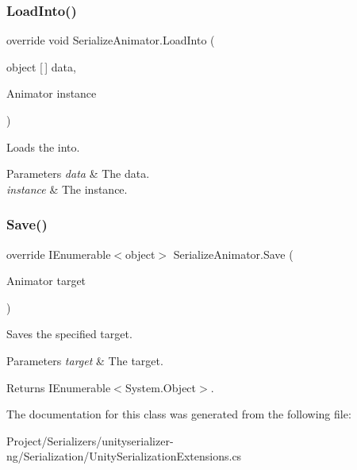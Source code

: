 \subsubsection{\texorpdfstring{Load\+Into()}{LoadInto()}}
{\footnotesize\ttfamily override void Serialize\+Animator.\+Load\+Into (\begin{DoxyParamCaption}\item[{object \mbox{[}$\,$\mbox{]}}]{data,  }\item[{Animator}]{instance }\end{DoxyParamCaption})\hspace{0.3cm}{\ttfamily [inline]}}



Loads the into. 


\begin{DoxyParams}{Parameters}
{\em data} & The data.\\
\hline
{\em instance} & The instance.\\
\hline
\end{DoxyParams}
\mbox{\label{class_serialize_animator_a1b0623fd6936bdb19d45bca748e3a7d8}} 
\subsubsection{\texorpdfstring{Save()}{Save()}}
{\footnotesize\ttfamily override I\+Enumerable$<$object$>$ Serialize\+Animator.\+Save (\begin{DoxyParamCaption}\item[{Animator}]{target }\end{DoxyParamCaption})\hspace{0.3cm}{\ttfamily [inline]}}



Saves the specified target. 


\begin{DoxyParams}{Parameters}
{\em target} & The target.\\
\hline
\end{DoxyParams}
\begin{DoxyReturn}{Returns}
I\+Enumerable$<$System.\+Object$>$.
\end{DoxyReturn}


The documentation for this class was generated from the following file\+:\begin{DoxyCompactItemize}
\item 
Project/\+Serializers/unityserializer-\/ng/\+Serialization/Unity\+Serialization\+Extensions.\+cs\end{DoxyCompactItemize}
